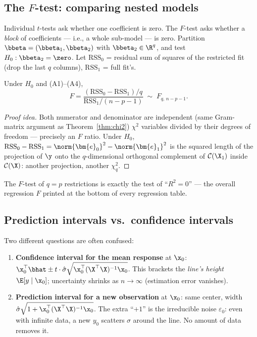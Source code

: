 \subsection{The $F$-test: comparing nested models}

Individual $t$-tests ask whether one coefficient is zero. The $F$-test asks whether a \emph{block} of coefficients — i.e., a whole sub-model — is zero. Partition $\bbeta = (\bbeta_1, \bbeta_2)$ with $\bbeta_2 \in \R^{q}$, and test $H_0: \bbeta_2 = \zero$. Let $\mathrm{RSS}_0$ = residual sum of squares of the restricted fit (drop the last $q$ columns), $\mathrm{RSS}_1$ = full fit's.

\begin{theorem}[$F$-statistic]\label{thm:F}
Under $H_0$ and (A1)--(A4),
\[
  F = \frac{(\mathrm{RSS}_0 - \mathrm{RSS}_1)/q}{\mathrm{RSS}_1/(n-p-1)} \;\sim\; F_{q,\, n-p-1}.
\]
\end{theorem}
\begin{proof}[Proof idea]
Both numerator and denominator are independent (same Gram-matrix argument as Theorem~\ref{thm:chi2}) $\chi^2$ variables divided by their degrees of freedom — precisely an $F$ ratio. Under $H_0$, $\mathrm{RSS}_0 - \mathrm{RSS}_1 = \norm{\bm{e}_0}^2 - \norm{\bm{e}_1}^2$ is the squared length of the projection of $\y$ onto the $q$-dimensional orthogonal complement of $\mathcal{C}(\X_1)$ inside $\mathcal{C}(\X)$: another projection, another $\chi^2_q$.
\end{proof}

The $F$-test of $q = p$ restrictions is exactly the test of ``$R^2 = 0$'' — the overall regression $F$ printed at the bottom of every regression table.

\subsection{Prediction intervals vs.\ confidence intervals}

Two different questions are often confused:

\begin{enumerate}[label=(\roman*)]
  \item \textbf{Confidence interval for the mean response} at $\x_0$: $\x_0^\top \bhat \pm t \cdot \hat{\sigma}\sqrt{\x_0^\top (\X^\top\X)^{-1} \x_0}$. This brackets the \emph{line's height} $\E[y \mid \x_0]$; uncertainty shrinks as $n \to \infty$ (estimation error vanishes).
  \item \textbf{Prediction interval for a new observation} at $\x_0$: same center, width $\hat{\sigma}\sqrt{1 + \x_0^\top (\X^\top\X)^{-1} \x_0}$. The extra ``$+1$'' is the irreducible noise $\varepsilon_0$: even with infinite data, a new $y_0$ scatters $\sigma$ around the line. No amount of data removes it.
\end{enumerate}

